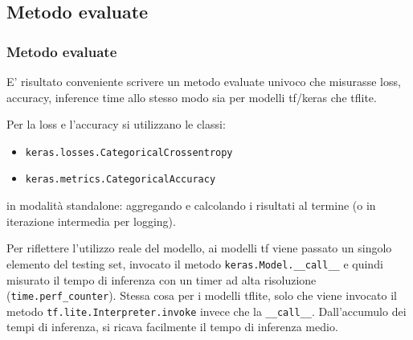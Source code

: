 \documentclass{beamer}
\newcommand{\dflvspace}{\vspace{10pt}}
\begin{document}
\subsection{Metodo evaluate}
\begin{frame}
	\frametitle{Metodo evaluate}
	
	E' risultato conveniente scrivere un metodo evaluate univoco che misurasse loss, accuracy, inference time
	allo stesso modo sia per modelli tf/keras che tflite.
	
	\dflvspace
	
	Per la loss e l'accuracy si utilizzano le classi:
	\begin{itemize}
		\item \texttt{keras.losses.CategoricalCrossentropy}
		\item \texttt{keras.metrics.CategoricalAccuracy}
	\end{itemize}
	in modalità standalone: aggregando e calcolando i risultati al termine (o in iterazione intermedia per logging).
	
	\dflvspace
	
	Per riflettere l'utilizzo reale del modello, ai modelli tf viene passato un singolo elemento del testing set,
	invocato il metodo \texttt{keras.Model.\_\_call\_\_} e quindi misurato il tempo di inferenza con un timer ad alta
	risoluzione (\texttt{time.perf\_counter}). Stessa cosa per i modelli tflite, solo che viene invocato il metodo
	\texttt{tf.lite.Interpreter.invoke} invece che la \texttt{\_\_call\_\_}. Dall'accumulo dei tempi di inferenza,
	si ricava facilmente il tempo di inferenza medio.
\end{frame}
\end{document}
